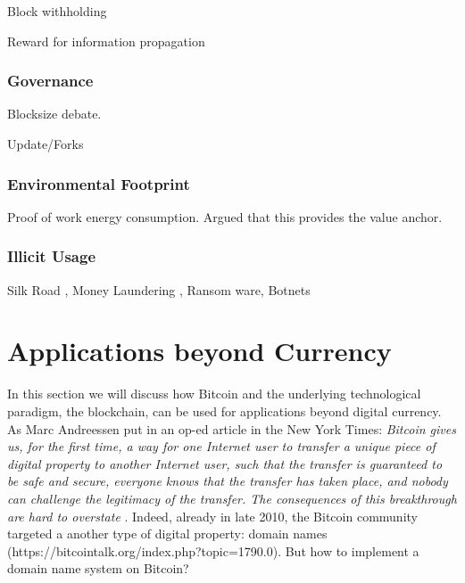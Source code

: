 Block withholding \parencite{DBLP:journals/corr/CourtoisB14}

\parencite{sapirshtein2015optimal}

Reward for information propagation \parencite{Babaioff:2012:BRB:2229012.2229022}

\subsubsection{Governance}

Blocksize debate.

Update/Forks \parencite{narayanan2015}




\subsubsection{Environmental Footprint}

Proof of work energy consumption. Argued that this provides the value anchor.

\parencite{6912770}

\parencite{Becker2013}


\subsubsection{Illicit Usage}

Silk Road \parencite{ADD:ADD3709,popper2015digital}, Money Laundering \parencite{bryans2014bitcoin,6805780}, Ransom ware, Botnets \parencite{Ali2015}


\section{Applications beyond Currency}
\label{sec:apps_beyond_currency}

In this section we will discuss how Bitcoin and the underlying technological paradigm, the blockchain, can be used for applications beyond digital currency. 
As Marc Andreessen put in an op-ed article in the New York Times: \emph{Bitcoin gives us, for the first time, a way for one Internet user to transfer a unique piece of digital property to another Internet user, such that the transfer is guaranteed to be safe and secure, everyone knows that the transfer has taken place, and nobody can challenge the legitimacy of the transfer. The consequences of this breakthrough are hard to overstate} \cite{andreessen2014}. Indeed, already in late 2010, the Bitcoin community targeted a another type of digital property: domain names (https://bitcointalk.org/index.php?topic=1790.0). But how to implement a domain name system on Bitcoin?

